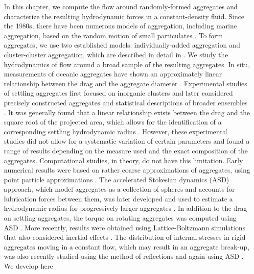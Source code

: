 %
In this chapter, we compute	the flow around randomly-formed aggregates and 
characterize the resulting hydrodynamic forces in a constant-density fluid.
Since the 1980s, there have been numerous models of aggregation, including marine aggregation, based on the random motion of small particulates 
\cite{rosenstock_cluster_1980, witten_diffusion-limited_1981,witten_tenuous_1986,kolb_anisotropic_1987}. To form aggregates, we use two established models: individually-added aggregation and cluster-cluster aggregation, which are described in detail in \cite{yoo_hydrodynamic_2020}. 
We study the hydrodynamics of flow around a broad sample of the resulting aggregates.
In situ, measurements of oceanic aggregates have shown an approximately linear relationship between the drag and the aggregate diameter \cite{alldredge_situ_1988}. Experimental studies of settling aggregates first focused on inorganic clusters \cite{wiltzius_hydrodynamic_1987} and later considered precisely constructed aggregates \cite{takayasu_determination_1998} and statistical descriptions of broader ensembles \cite{johnson_settling_1996}. 
It was generally found that a linear relationship exists between the drag and the square root of the projected area, which allows for the identification of a corresponding settling hydrodynamic radius \cite{johnson_settling_1996, tang_model_2002}.
However, these experimental studies did not allow for a systematic variation of certain parameters and found a range of results depending on the measure used and the exact composition of the aggregates.  Computational studies, in theory, do not have this limitation. Early numerical results were based on rather coarse approximations of aggregates, using point particle approximations \cite{chen_translational_1984}. The accelerated Stokesian dynamics (ASD) approach, which model aggregates as a collection of spheres and accounts for lubrication forces between them, was later developed \cite{brady_stokesian_1988} and used to estimate a hydrodynamic radius for progressively larger aggregates \cite{rogak_stokes_1990,bossis_hydrodynamic_1991}.
In addition to the drag on settling aggregates, the torque on rotating aggregates 
was computed using ASD \cite{binder_structural_2009}. More recently, results were obtained using Lattice-Boltzmann simulations that also considered inertial effects \cite{zhang_direct_2015}. The distribution of internal stresses in rigid aggregates moving in a constant flow, which may result in an aggregate break-up, was also recently studied using the method of reflections  \cite{gastaldi_distribution_2011} and again using ASD  \cite{vanni_accurate_2015}. We develop here 
